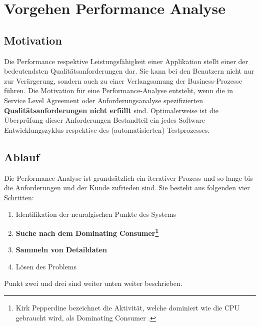 \chapter{Vorgehen Performance Analyse}
\section{Motivation}

Die Performance respektive Leistungsfähigkeit einer Applikation stellt einer der bedeutendsten Qualitätsanforderungen dar. Sie kann bei den Benutzern nicht nur zur Verärgerung, sondern auch zu einer Verlangsamung der Business-Prozesse führen. Die Motivation für eine Performance-Analyse entsteht, wenn die in Service Level Agreement oder Anforderungsanalyse spezifizierten \textbf{Qualitätsanforderungen nicht erfüllt} sind. Optimalerweise ist die Überprüfung dieser Anforderungen Bestandteil ein jedes Software Entwicklungszyklus respektive des (automatisierten) Testprozesses.

\section{Ablauf}
Die Performance-Analyse ist grundsätzlich ein iterativer Prozess und so lange bis die Anforderungen und der Kunde zufrieden sind. Sie besteht aus folgenden vier Schritten\cite{hummelBeer201109}:
\begin{enumerate}
	\item Identifikation der neuralgischen Punkte des Systems
	\item \textbf{Suche nach dem Dominating Consumer\footnote{Kirk Pepperdine bezeichnet die Aktivität, welche dominiert wie die CPU gebraucht wird, als Dominating Consumer . }}
	\item \textbf{Sammeln von Detaildaten}
	\item Lösen des Problems
\end{enumerate}

Punkt zwei und drei sind weiter unten weiter beschrieben.

